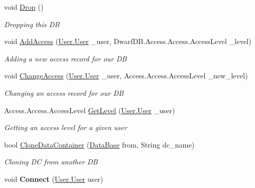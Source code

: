 \begin{DoxyCompactItemize}
\item 
void \hyperlink{class_dwarf_d_b_1_1_data_structures_1_1_data_base_ae169105e97a66c5d621b3d945d11fce4}{Drop} ()
\begin{DoxyCompactList}\small\item\em Dropping this D\+B \end{DoxyCompactList}\item 
void \hyperlink{class_dwarf_d_b_1_1_data_structures_1_1_data_base_ab4f35460ca4de56345bffde22b2fc538}{Add\+Access} (\hyperlink{class_dwarf_d_b_1_1_user_1_1_user}{User.\+User} \+\_\+user, Dwarf\+D\+B.\+Access.\+Access.\+Access\+Level \+\_\+level)
\begin{DoxyCompactList}\small\item\em Adding a new access record for our D\+B \end{DoxyCompactList}\item 
void \hyperlink{class_dwarf_d_b_1_1_data_structures_1_1_data_base_a4eaa522f122464c04a13d1ed104f6326}{Change\+Access} (\hyperlink{class_dwarf_d_b_1_1_user_1_1_user}{User.\+User} \+\_\+user, Access.\+Access.\+Access\+Level \+\_\+new\+\_\+level)
\begin{DoxyCompactList}\small\item\em Changing an access record for our D\+B \end{DoxyCompactList}\item 
Access.\+Access.\+Access\+Level \hyperlink{class_dwarf_d_b_1_1_data_structures_1_1_data_base_ade3f44a53526bbfbe698a18ca62e67a4}{Get\+Level} (\hyperlink{class_dwarf_d_b_1_1_user_1_1_user}{User.\+User} \+\_\+user)
\begin{DoxyCompactList}\small\item\em Getting an access level for a given user \end{DoxyCompactList}\item 
bool \hyperlink{class_dwarf_d_b_1_1_data_structures_1_1_data_base_af1cedf55fdab7efe9154ea7570c9abc9}{Clone\+Data\+Container} (\hyperlink{class_dwarf_d_b_1_1_data_structures_1_1_data_base}{Data\+Base} from, String dc\+\_\+name)
\begin{DoxyCompactList}\small\item\em Cloning D\+C from another D\+B \end{DoxyCompactList}\item 
\hypertarget{class_dwarf_d_b_1_1_data_structures_1_1_data_base_ae0180400ee59265e19a5d981f59ca440}{void {\bfseries Connect} (\hyperlink{class_dwarf_d_b_1_1_user_1_1_user}{User.\+User} user)}\label{class_dwarf_d_b_1_1_data_structures_1_1_data_base_ae0180400ee59265e19a5d981f59ca440}


\end{DoxyCompactItemize}
